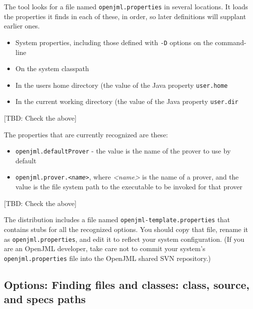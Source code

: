 The tool looks for a file named {\tt openjml.properties} in several locations. It loads the
properties it finds in each of these, in order, so later definitions will supplant earlier ones.
\begin{itemize}\nospace
\item System properties, including those defined with {\tt -D} options on the command-line
\item On the system classpath
\item In the users home directory (the value of the Java property {\tt user.home}
\item In the current working directory (the value of the Java property {\tt user.dir}
\end{itemize}
[TBD: Check the above]

The properties that are currently recognized are these:
\begin{itemize}\nospace
\item {\tt openjml.defaultProver} - the value is the name of the prover to use by default
\item {\tt openjml.prover.{\it <name>}}, where {\it <name>} is the name of a prover, and
the value is the file system path to the executable to be invoked for that prover
\end{itemize}
[TBD: Check the above]

The distribution includes a file named {\tt openjml-template.properties} that contains stubs for all the recognized options.
You should copy that file, rename it as {\tt openjml.properties}, and edit it to reflect your system configuration.
(If you are an OpenJML developer, take care not to commit your system's {\tt openjml.properties} file into the OpenJML shared SVN repository.)

\subsection{Options: Finding files and classes: class, source, and specs paths}
\label{OptionsPaths}

